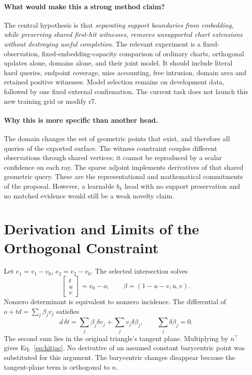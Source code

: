 \paragraph{What would make this a strong method claim?}
The central hypothesis is that \emph{separating support boundaries from embedding, while preserving shared first-hit witnesses, removes unsupported chart extensions without destroying useful completion}. The relevant experiment is a fixed-observation, fixed-embedding-capacity comparison of ordinary charts, orthogonal updates alone, domains alone, and their joint model. It should include literal hard queries, endpoint coverage, miss accounting, free intrusion, domain area and retained positive witnesses. Model selection remains on development data, followed by one fixed external confirmation. The current task does not launch this new training grid or modify r7.

\paragraph{Why this is more specific than another head.}
The domain changes the set of geometric points that exist, and therefore all queries of the exported surface. The witness constraint couples different observations through shared vertices; it cannot be reproduced by a scalar confidence on each ray. The sparse adjoint implements derivatives of that shared geometric query. These are the representational and mathematical commitments of the proposal. However, a learnable $b_k$ head with no support preservation and no matched evidence would still be a weak novelty claim.

\section{Derivation and Limits of the Orthogonal Constraint}
Let $e_1=v_1-v_0$, $e_2=v_2-v_0$. The selected intersection solves
\begin{equation}
 [d,-e_1,-e_2]\begin{bmatrix}t\\u\\v\end{bmatrix}=v_0-o,
 \qquad\beta=(1-u-v,u,v).
\end{equation}
Nonzero determinant is equivalent to nonzero incidence. The differential of $o+td=\sum_j\beta_jv_j$ satisfies
\begin{equation}
 d\,\delta t=\sum_j\beta_j\delta v_j+\sum_jv_j\delta\beta_j,
 \qquad\sum_j\delta\beta_j=0.
\end{equation}
The second sum lies in the original triangle's tangent plane. Multiplying by $n^\top$ gives Eq.~\ref{eq:hitjac}. No derivative of an assumed constant barycentric point was substituted for this argument. The barycentric changes disappear because the tangent-plane term is orthogonal to $n$.

